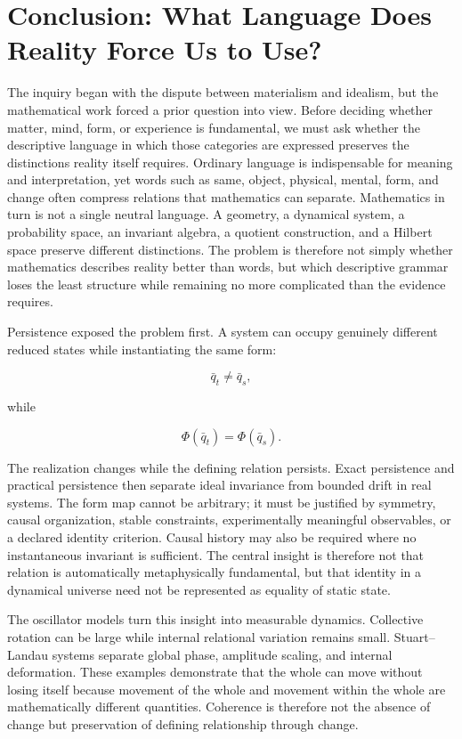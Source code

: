 \chapter{Conclusion: What Language Does Reality Force Us to Use?}

The inquiry began with the dispute between materialism and idealism, but the mathematical work forced a prior question into view. Before deciding whether matter, mind, form, or experience is fundamental, we must ask whether the descriptive language in which those categories are expressed preserves the distinctions reality itself requires. Ordinary language is indispensable for meaning and interpretation, yet words such as same, object, physical, mental, form, and change often compress relations that mathematics can separate. Mathematics in turn is not a single neutral language. A geometry, a dynamical system, a probability space, an invariant algebra, a quotient construction, and a Hilbert space preserve different distinctions. The problem is therefore not simply whether mathematics describes reality better than words, but which descriptive grammar loses the least structure while remaining no more complicated than the evidence requires.

Persistence exposed the problem first. A system can occupy genuinely different reduced states while instantiating the same form:

\[
\bar q_t\neq\bar q_s,
\]

while

\[
\Phi(\bar q_t)=\Phi(\bar q_s).
\]

The realization changes while the defining relation persists. Exact persistence and practical persistence then separate ideal invariance from bounded drift in real systems. The form map cannot be arbitrary; it must be justified by symmetry, causal organization, stable constraints, experimentally meaningful observables, or a declared identity criterion. Causal history may also be required where no instantaneous invariant is sufficient. The central insight is therefore not that relation is automatically metaphysically fundamental, but that identity in a dynamical universe need not be represented as equality of static state.

The oscillator models turn this insight into measurable dynamics. Collective rotation can be large while internal relational variation remains small. Stuart--Landau systems separate global phase, amplitude scaling, and internal deformation. These examples demonstrate that the whole can move without losing itself because movement of the whole and movement within the whole are mathematically different quantities. Coherence is therefore not the absence of change but preservation of defining relationship through change.

